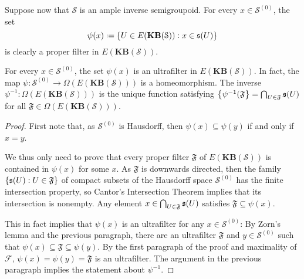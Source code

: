 Suppose now that $\mathcal{S}$ is an ample inverse semigroupoid. For every $x\in\mathcal{S}^{(0)}$, the set \[\psi(x)\defeq\left\{U\in E(\mathbf{KB}(\mathcal{S})):x\in\so(U)\right\}\]
is clearly a proper filter in $E(\mathbf{KB}(\mathcal{S}))$.

\begin{lemma}\label{lem:homeomorphisms0spectrum}
    For every $x\in\mathcal{S}^{(0)}$, the set $\psi(x)$ is an ultrafilter in $E(\mathbf{KB}(\mathcal{S}))$. In fact, the map $\psi\colon \mathcal{S}^{(0)}\to\Omega(E(\mathbf{KB}(\mathcal{S})))$ is a homeomorphism. The inverse $\psi^{-1}\colon\Omega(E(\mathbf{KB}(\mathcal{S})))$ is the unique function satisfying $\left\{\psi^{-1}(\mathfrak{F}\right\}=\bigcap_{U\in\mathfrak{F}}\operatorname{\mathfrak{s}}(U)$ for all $\mathfrak{F}\in\Omega(E(\mathbf{KB}(\mathcal{S})))$.
\end{lemma}
\begin{proof}
    First note that, as $\mathcal{S}^{(0)}$ is Hausdorff, then $\psi(x)\subseteq\psi(y)$ if and only if $x=y$. 
    
    We thus only need to prove that every proper filter $\mathfrak{F}$ of $E(\mathbf{KB}(\mathcal{S}))$ is contained in $\psi(x)$ for some $x$. As $\mathfrak{F}$ is downwards directed, then the family $\left\{\operatorname{\mathfrak{s}}(U):U\in\mathfrak{F}\right\}$ of compact subsets of the Hausdorff space $\mathcal{S}^{(0)}$ has the finite intersection property, so Cantor's Intersection Theorem implies that its intersection is nonempty. Any element $x\in\bigcap_{U\in\mathfrak{F}}\operatorname{\mathfrak{s}}(U)$ satisfies $\mathfrak{F}\subseteq\psi(x)$.
    
    This in fact implies that $\psi(x)$ is an ultrafilter for any $x\in\mathcal{S}^{(0)}$: By Zorn's lemma and the previous paragraph, there are an ultrafilter $\mathfrak{F}$ and $y\in\mathcal{S}^{(0)}$ such that $\psi(x)\subseteq\mathfrak{F}\subseteq\psi(y)$. By the first paragraph of the proof and maximality of $\mathcal{F}$, $\psi(x)=\psi(y)=\mathfrak{F}$ is an ultrafilter. The argument in the previous paragraph implies the statement about $\psi^{-1}$.\qedhere
\end{proof}

